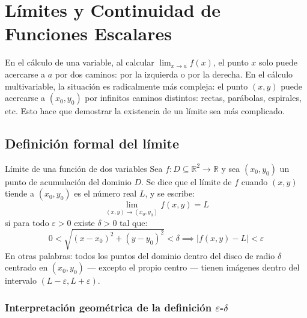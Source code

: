 \section{Límites y Continuidad de Funciones Escalares}

En el cálculo de una variable, al calcular $\lim_{x \to a} f(x)$, el punto $x$ solo puede acercarse a $a$ por dos caminos: por la izquierda o por la derecha. En el cálculo multivariable, la situación es radicalmente más compleja: el punto $(x, y)$ puede acercarse a $(x_0, y_0)$ por infinitos caminos distintos: rectas, parábolas, espirales, etc. Esto hace que demostrar la existencia de un límite sea más complicado.

\subsection{Definición formal del límite}

\begin{mydefinition}{Límite de una función de dos variables}
Sea $f: D \subseteq \mathbb{R}^2 \to \mathbb{R}$ y sea $(x_0, y_0)$ un punto de acumulación del dominio $D$. Se dice que el límite de $f$ cuando $(x,y)$ tiende a $(x_0, y_0)$ es el número real $L$, y se escribe:
\[ \lim_{(x,y) \to (x_0,y_0)} f(x,y) = L \]
si para todo $\varepsilon > 0$ existe $\delta > 0$ tal que:
\[ 0 < \sqrt{(x-x_0)^2 + (y-y_0)^2} < \delta \implies |f(x,y) - L| < \varepsilon \]
En otras palabras: todos los puntos del dominio dentro del disco de radio $\delta$ centrado en $(x_0, y_0)$ — excepto el propio centro — tienen imágenes dentro del intervalo $(L-\varepsilon, L+\varepsilon)$.
\end{mydefinition}

\subsubsection{Interpretación geométrica de la definición $\varepsilon$-$\delta$}

